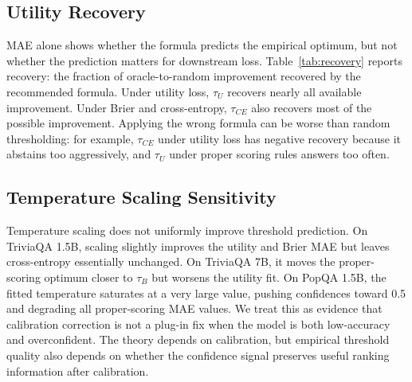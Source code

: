 \documentclass[letterpaper,10pt,twocolumn]{article}
\begin{document}
\subsection{Utility Recovery}

MAE alone shows whether the formula predicts the empirical optimum, but not
whether the prediction matters for downstream loss. Table~\ref{tab:recovery}
reports recovery: the fraction of oracle-to-random improvement recovered by
the recommended formula. Under utility loss, $\tau_U$ recovers nearly all
available improvement. Under Brier and cross-entropy, $\tau_{CE}$ also
recovers most of the possible improvement. Applying the wrong formula can be
worse than random thresholding: for example, $\tau_{CE}$ under utility loss
has negative recovery because it abstains too aggressively, and $\tau_U$
under proper scoring rules answers too often.

\begin{table}[t]
\centering
\caption{Recovery rate for the recommended formula using
\texttt{token\_prob\_first}. Higher is better.}
\label{tab:recovery}
\renewcommand{\arraystretch}{1.12}
\end{table}

\subsection{Temperature Scaling Sensitivity}

Temperature scaling does not uniformly improve threshold prediction. On
TriviaQA 1.5B, scaling slightly improves the utility and Brier MAE but leaves
cross-entropy essentially unchanged. On TriviaQA 7B, it moves the
proper-scoring optimum closer to $\tau_B$ but worsens the utility fit. On
PopQA 1.5B, the fitted temperature saturates at a very large value, pushing
confidences toward 0.5 and degrading all proper-scoring MAE values. We treat
this as evidence that calibration correction is not a plug-in fix when the
model is both low-accuracy and overconfident. The theory depends on
calibration, but empirical threshold quality also depends on whether the
confidence signal preserves useful ranking information after calibration.
\end{document}

